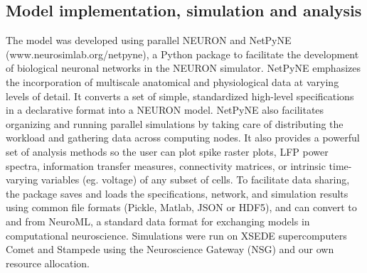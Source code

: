 \subsection{Model implementation, simulation and analysis}

The model was developed using parallel NEURON \cite{Lytt16b} and NetPyNE \cite{Dura16c} (www.neurosimlab.org/netpyne), a Python package to facilitate the development of biological neuronal networks in the NEURON simulator. NetPyNE emphasizes  the incorporation of multiscale anatomical and physiological data at varying levels of detail. It converts a set of simple, standardized high-level specifications in a declarative format into a NEURON model. NetPyNE also facilitates organizing and running parallel simulations by taking care of distributing the workload and gathering data across computing nodes. It also provides a powerful set of analysis methods so the user can plot spike raster plots, LFP power spectra, information transfer measures, connectivity matrices, or intrinsic time-varying variables (eg. voltage) of any subset of cells. To facilitate data sharing, the package saves and loads the specifications, network, and simulation results using common file formats (Pickle, Matlab, JSON or HDF5), and can convert to and from NeuroML, a standard data format for exchanging models in computational neuroscience. Simulations were run on XSEDE supercomputers Comet and Stampede using the Neuroscience Gateway (NSG) and our own resource allocation. 




